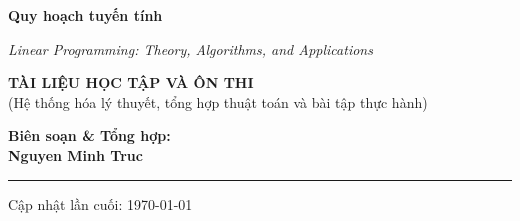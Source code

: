 \LPshowsidebarlayoutfalse
{}

\begin{titlepage}
    \thispagestyle{empty}
    \begin{center}
        \vspace*{3cm} %
        
        \Huge
        \textbf{\MakeUppercase{}{}{Quy hoạch tuyến tính}}
        
        \vspace{0.8cm}
        
        \LARGE
        \textit{Linear Programming: Theory, Algorithms, and Applications}
        
        \vspace{2cm}
        
        \Large
        \textbf{TÀI LIỆU HỌC TẬP VÀ ÔN THI} \\
        \vspace{0.5cm}
        \normalsize
        (Hệ thống hóa lý thuyết, tổng hợp thuật toán và bài tập thực hành)
        
        \vfill %
        
        \Large
        \textbf{Biên soạn \& Tổng hợp:} \\
        \vspace{0.3cm}
        \LARGE
        \textbf{Nguyen Minh Truc}
        
        \vspace{1.5cm}
        
        \rule{0.6\textwidth}{0.4pt}
        
        \vspace{0.5cm}
        \large
        Cập nhật lần cuối: \today
        
    \end{center}
\end{titlepage}

\restoregeometry
\LPshowsidebarlayouttrue